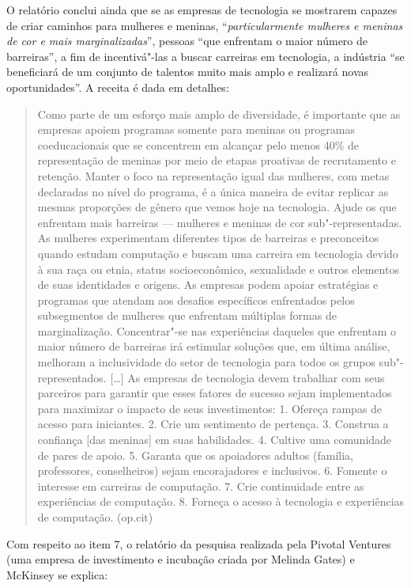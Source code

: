 O relatório conclui ainda que se as empresas de tecnologia se mostrarem
capazes de criar caminhos para mulheres e meninas,
``\emph{particularmente mulheres e meninas de cor e mais
marginalizadas}'', pessoas ``que enfrentam o maior número de
barreiras'', a fim de incentivá"-las a buscar carreiras em tecnologia, a
indústria ``se beneficiará de um conjunto de talentos muito mais amplo e
realizará novas oportunidades''. A receita é dada em detalhes:

\begin{quote}
Como parte de um esforço mais amplo de diversidade, é importante que as
empresas apoiem programas somente para meninas ou programas
coeducacionais que se concentrem em alcançar pelo menos 40\% de
representação de meninas por meio de etapas proativas de recrutamento e
retenção. Manter o foco na representação igual das mulheres, com metas
declaradas no nível do programa, é a única maneira de evitar replicar as
mesmas proporções de gênero que vemos hoje na tecnologia. Ajude os que
enfrentam mais barreiras --- mulheres e meninas de cor sub"-representadas.
As mulheres experimentam diferentes tipos de barreiras e preconceitos
quando estudam computação e buscam uma carreira em tecnologia devido à
sua raça ou etnia, status socioeconômico, sexualidade e outros elementos
de suas identidades e origens. As empresas podem apoiar estratégias e
programas que atendam aos desafios específicos enfrentados pelos
subsegmentos de mulheres que enfrentam múltiplas formas de
marginalização. Concentrar"-se nas experiências daqueles que enfrentam o
maior número de barreiras irá estimular soluções que, em última análise,
melhoram a inclusividade do setor de tecnologia para todos os grupos
sub"-representados. {[}\ldots{}{]} As empresas de tecnologia devem trabalhar
com seus parceiros para garantir que esses fatores de sucesso sejam
implementados para maximizar o impacto de seus investimentos: 1. Ofereça
rampas de acesso para iniciantes. 2. Crie um sentimento de pertença. 3.
Construa a confiança {[}das meninas{]} em suas habilidades. 4. Cultive
uma comunidade de pares de apoio. 5. Garanta que os apoiadores adultos
(família, professores, conselheiros) sejam encorajadores e inclusivos.
6. Fomente o interesse em carreiras de computação. 7. Crie continuidade
entre as experiências de computação. 8. Forneça o acesso à tecnologia e
experiências de computação. (op.cit)
\end{quote}

Com respeito ao item 7, o relatório da pesquisa realizada pela Pivotal
Ventures (uma empresa de investimento e incubação criada por Melinda
Gates) e McKinsey se explica:

